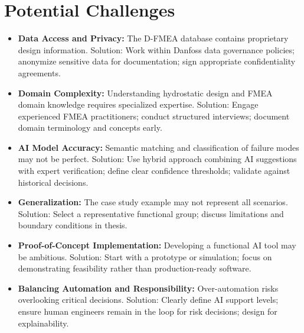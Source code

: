 
\section{Potential Challenges}

\begin{itemize}
    \item \textbf{Data Access and Privacy:} The D-FMEA database contains proprietary design information. Solution: Work within Danfoss data governance policies; anonymize sensitive data for documentation; sign appropriate confidentiality agreements.
    
    \item \textbf{Domain Complexity:} Understanding hydrostatic design and FMEA domain knowledge requires specialized expertise. Solution: Engage experienced FMEA practitioners; conduct structured interviews; document domain terminology and concepts early.
    
    \item \textbf{AI Model Accuracy:} Semantic matching and classification of failure modes may not be perfect. Solution: Use hybrid approach combining AI suggestions with expert verification; define clear confidence thresholds; validate against historical decisions.
    
    \item \textbf{Generalization:} The case study example may not represent all scenarios. Solution: Select a representative functional group; discuss limitations and boundary conditions in thesis.
    
    \item \textbf{Proof-of-Concept Implementation:} Developing a functional AI tool may be ambitious. Solution: Start with a prototype or simulation; focus on demonstrating feasibility rather than production-ready software.
    
    \item \textbf{Balancing Automation and Responsibility:} Over-automation risks overlooking critical decisions. Solution: Clearly define AI support levels; ensure human engineers remain in the loop for risk decisions; design for explainability.
\end{itemize}
